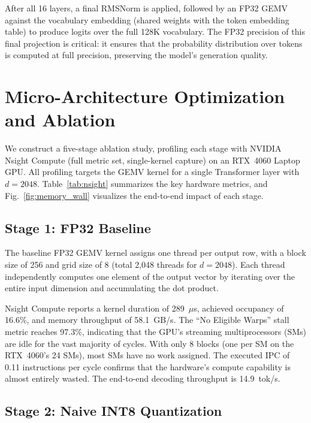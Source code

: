 \documentclass[conference]{IEEEtran}
\begin{document}
After all 16 layers, a final RMSNorm is applied, followed by an FP32 GEMV against the vocabulary embedding (shared weights with the token embedding table) to produce logits over the full 128K vocabulary. The FP32 precision of this final projection is critical: it ensures that the probability distribution over tokens is computed at full precision, preserving the model's generation quality.

\section{Micro-Architecture Optimization and Ablation}

We construct a five-stage ablation study, profiling each stage with NVIDIA Nsight Compute (full metric set, single-kernel capture) on an RTX~4060 Laptop GPU. All profiling targets the GEMV kernel for a single Transformer layer with $d=2048$. Table~\ref{tab:nsight} summarizes the key hardware metrics, and Fig.~\ref{fig:memory_wall} visualizes the end-to-end impact of each stage.

\subsection{Stage 1: FP32 Baseline}
The baseline FP32 GEMV kernel assigns one thread per output row, with a block size of 256 and grid size of 8 (total 2,048 threads for $d=2048$). Each thread independently computes one element of the output vector by iterating over the entire input dimension and accumulating the dot product.

Nsight Compute reports a kernel duration of 289~$\mu$s, achieved occupancy of 16.6\%, and memory throughput of 58.1~GB/s. The ``No Eligible Warps'' stall metric reaches 97.3\%, indicating that the GPU's streaming multiprocessors (SMs) are idle for the vast majority of cycles. With only 8 blocks (one per SM on the RTX~4060's 24 SMs), most SMs have no work assigned. The executed IPC of 0.11 instructions per cycle confirms that the hardware's compute capability is almost entirely wasted. The end-to-end decoding throughput is 14.9~tok/s.

\subsection{Stage 2: Naive INT8 Quantization}
\end{document}
